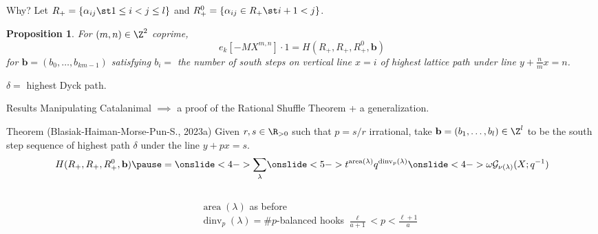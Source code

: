 \documentclass[dvipsnames,handout]{beamer}
\newcommand{\Gcal}{{\mathcal G}}
\DeclareMathOperator{\dinv}{dinv}
\DeclareMathOperator{\area}{area}
\newcommand{\bb}{{\mathbf b}}
\newtheorem{prop}{Proposition}
\theoremstyle{definition}
\newcounter{c}
\begin{document}
\begin{frame}{Why?}
  Let \(R_+ = \{\alpha_{ij} \st 1 \leq i < j \leq l\}\) and \(R_+^0 =
  \{\alpha_{ij} \in R_+
  \st i+1 < j\}\). \pause
  
  \begin{prop}
    For \((m,n) \in \Z^2\) coprime,
    \[e_k[-MX^{m,n}] \cdot 1 = H(R_+, R_+, R_+^0, \bb)\] for
    \(\bb = (b_0, \ldots, b_{km-1})\) satisfying \(b_i =\) the number
    of south steps on vertical line \(x=i\) of highest lattice path under line 
    \(y+\frac{n}{m} x = n\).
  \end{prop}
  \(\delta =\) highest Dyck path.

\end{frame}
\begin{frame}{Results}
 Manipulating Catalanimal \(\implies\)
 a proof of the Rational Shuffle Theorem + a generalization. 
  \begin{block}{Theorem (Blasiak-Haiman-Morse-Pun-S., 2023a)}
    Given \(r,s \in \R_{>0}\) such that \(p = s/r\) irrational, take
    \(\bb = (b_1,\ldots,b_l) \in \Z^l\) to be the south step sequence of highest path
    \(\delta\) under the line \(y+px=s\).
    \pause \[
      H(R_+,R_+,R_+^0,\bb) \pause =
      \onslide<4->{\sum_{\lambda}}\onslide<5->
      {
        t^{\area(\lambda)}
        q^{\dinv_p(\lambda)}}\onslide<4->{\omega \Gcal_{\nu(\lambda)}(X;q^{-1})}
    \]
  \end{block}\pause
  \begin{columns}
    \begin{column}{0.2\textwidth}
    \end{column}
    \begin{column}{0.8\textwidth}
      \(\area(\lambda)\) as before\\
      \(\dinv_p(\lambda) = \# p\)-balanced hooks \(\frac{\ell}{a+1} < p <
      \frac{\ell+1}{a}\)\\
    \end{column}
  \end{columns}
\end{frame}
\end{document}
